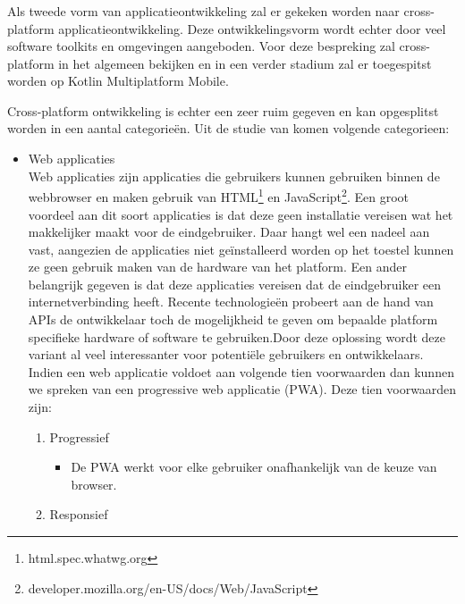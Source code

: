 \subsubsection{}
\label{sec:SVZcrossplatform}
Als tweede vorm van applicatieontwikkeling zal er gekeken worden naar cross-platform applicatieontwikkeling. Deze ontwikkelingsvorm wordt echter door veel software toolkits en omgevingen aangeboden. Voor deze bespreking zal cross-platform in het algemeen bekijken en in een verder stadium zal er toegespitst worden op Kotlin Multiplatform Mobile.

Cross-platform ontwikkeling is echter een zeer ruim gegeven en kan opgesplitst worden in een aantal categorieën. Uit de studie van \textcite{Xanthopoulos2013} komen volgende categorieen:
\begin{itemize}
    \item Web applicaties\\
    Web applicaties zijn applicaties die gebruikers kunnen gebruiken binnen de webbrowser en maken gebruik van HTML\footnote{html.spec.whatwg.org} en JavaScript\footnote{developer.mozilla.org/en-US/docs/Web/JavaScript}. Een groot voordeel aan dit soort applicaties is dat deze geen installatie vereisen wat het makkelijker maakt voor de eindgebruiker. Daar hangt wel een nadeel aan vast, aangezien de applicaties niet geïnstalleerd worden op het toestel kunnen ze geen gebruik maken van de hardware van het platform. Een ander belangrijk gegeven is dat deze applicaties vereisen dat de eindgebruiker een internetverbinding heeft. Recente technologieën probeert aan de hand van APIs de ontwikkelaar toch de mogelijkheid te geven om bepaalde platform specifieke hardware of software te gebruiken.Door deze oplossing wordt deze variant al veel interessanter voor potentiële gebruikers en ontwikkelaars. Indien een web applicatie voldoet aan volgende tien voorwaarden \autocite{Osmani2015} dan kunnen we spreken van een progressive web applicatie (PWA). Deze tien voorwaarden zijn: 
    \begin{enumerate}
       \item Progressief
       \begin{itemize}
           \item De PWA werkt voor elke gebruiker onafhankelijk van de keuze van browser.
       \end{itemize}
       \item Responsief
       \begin{itemize}

\end{itemize}
\end{enumerate}
\end{itemize}
